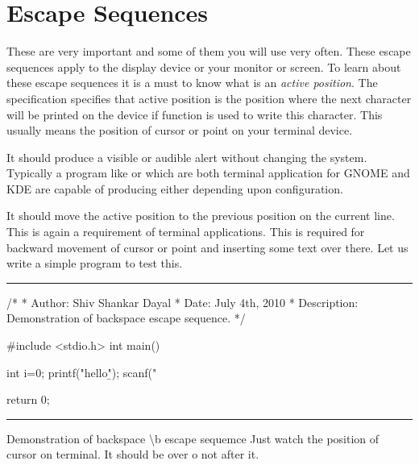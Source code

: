 \section{Escape Sequences}
These are very important and some of them you will use very
often. These escape sequences apply to the display device or your
monitor or screen. To learn about these escape sequences it is a must
to know what is an {\it active position}. The specification specifies
that active position is the position where the next character will be
printed on the device if  function is used to write this
character. This usually means the position of cursor or point on your
terminal device.
\startitemize[n]
\item{}\textreference[alert]It should produce a visible
  or audible alert without changing the system. Typically a program
  like  or  which are both terminal
  application for GNOME and KDE are capable of producing either
  depending upon configuration.
\item{}\textreference[backspace]It should move the
  active position to the previous position on the current line. This
  is again a requirement of terminal applications. This is required
  for backward movement of cursor or point and inserting some text
  over there. Let us write a simple program to test this.
\blank[force,1mm]\hrule\blank[force,1mm]
\startCPP
/*
 * Author: Shiv Shankar Dayal
 * Date: July 4th, 2010
 * Description: Demonstration of backspace escape sequence.
 */

#include <stdio.h>
int main()
{
  int i=0;
  printf("hello\b");
  scanf("%

  return 0;
}
\stopCPP
{}
\hrule
\blank[force,1mm]
\startalignment[middle]
Demonstration of backspace \backslash b escape sequemce
\stopalignment
Just watch the position of cursor on terminal. It should be over o not
after it.
\stopitemize

